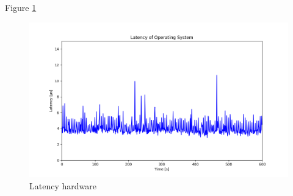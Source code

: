 \documentclass[MMR,Master,english]{twbook}
\begin{document}
 


 Figure \ref{fig:latency_hardware}
 \begin{figure}[H]
   \centering
   \includegraphics[width=0.8\columnwidth]{img/latency_hardware.png}
   \caption[Latency hardware]{Latency hardware}
   \label{fig:latency_hardware}
 \end{figure}
 
\end{document}
